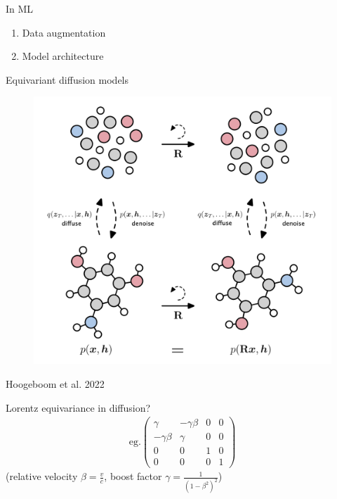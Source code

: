 \documentclass[aspectratio=169,xcolor=dvipsnames]{beamer}
\begin{document}
\begin{frame}{In ML}
  \begin{enumerate}
    \item Data augmentation
    \pause
    \item Model architecture
  \end{enumerate}
\end{frame}

\begin{frame}{Equivariant diffusion models}
    \begin{figure}
    \centering
    \includegraphics[height=0.75\textheight]{figs/equivariant-rotation-pcloud-molecule-Hoogeboom2022}
  \end{figure}
  \centering  
  \small{Hoogeboom et al. 2022}
\end{frame}

\begin{frame}{Lorentz equivariance in diffusion?}  
  \pause
  \begin{align*}
    \text{eg.} \begin{pmatrix}
      \gamma & -\gamma \beta & 0 & 0\\
      -\gamma \beta & \gamma & 0 & 0\\
      0 & 0 & 1 & 0\\
      0 & 0 & 0 & 1
    \end{pmatrix}
  \end{align*}
  \centering
  (relative velocity $\beta = \frac{v}{c}$, boost factor $\gamma = \frac{1}{(1-\beta^2)^2}$)
\end{frame}
\end{document}
